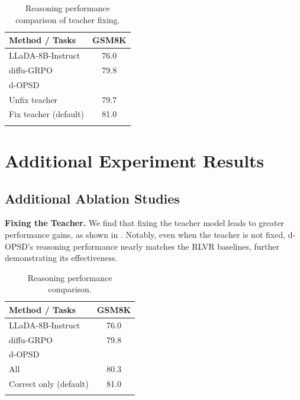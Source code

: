 \documentclass{llmxive}
\begin{document}
\begin{table}[t]
\vspace{-65pt}
\setlength{\tabcolsep}{4pt}
\centering
\begin{tabular}{lc}
\toprule
\textbf{Method / Tasks} & \textbf{GSM8K} \\
\midrule
LLaDA-8B-Instruct & 76.0 \\
diffu-GRPO & 79.8 \\
d-OPSD \\
\quad Unfix teacher & 79.7 \\
\quad Fix teacher (default) & \cellcolor{lightblue} 81.0 \\
\bottomrule
\label{app_tab1}
\end{tabular}
\vspace{-30pt}

\caption{Reasoning performance comparison of teacher fixing.}
\end{table}

\section{Additional Experiment Results} \label{app5}

\subsection{Additional Ablation Studies} \label{app5.1}


\textbf{Fixing the Teacher. } We find that fixing the teacher model leads to greater performance gains, as shown in . Notably, even when the teacher is not fixed, d-OPSD's reasoning performance nearly matches the RLVR baselines, further demonstrating its effectiveness.



\begin{table}[t]
\vspace{-7pt}
\setlength{\tabcolsep}{4pt}
\centering
\begin{tabular}{lc}
\toprule
\textbf{Method / Tasks} & \textbf{GSM8K} \\
\midrule
LLaDA-8B-Instruct & 76.0 \\
diffu-GRPO & 79.8 \\
d-OPSD \\
\quad All & 80.3 \\
\quad Correct only (default) & \cellcolor{lightblue} 81.0 \\
\bottomrule
\label{app_tab2}
\end{tabular}
\vspace{-50pt}

\caption{Reasoning performance comparison.}
\end{table}
\end{document}
